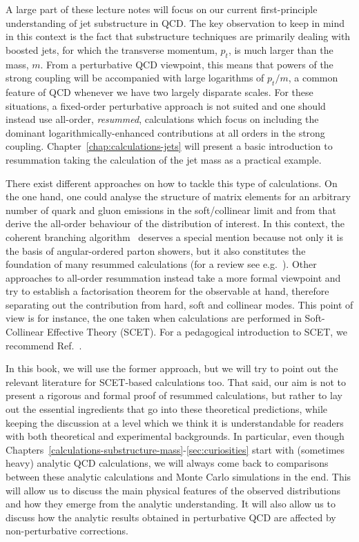 

A large part of these lecture notes will focus on our current
first-principle understanding of jet substructure in QCD.
%
The key observation to keep in mind in this context is the fact that
substructure techniques are primarily dealing with boosted jets, for
which the transverse momentum, $p_t$, is much larger than the mass,
$m$.
%
From a perturbative QCD viewpoint, this means that powers of the
strong coupling will be accompanied with large logarithms of $p_t/m$,
a common feature of QCD whenever we have two largely disparate scales.
%
For these situations, a fixed-order perturbative approach is not
suited and one should instead use all-order, {\em resummed},
calculations which focus on including the dominant
logarithmically-enhanced contributions at all orders in the strong
coupling.
%
Chapter~\ref{chap:calculations-jets} will present a basic
introduction to resummation taking the calculation of the jet mass as
a practical example.


There exist different approaches on how to tackle this type of
calculations. On the one hand, one could analyse the structure of
matrix elements for an arbitrary number of quark and gluon emissions
in the soft/collinear limit and from that derive the all-order
behaviour of the distribution of interest. In this context, the
coherent branching algorithm~\cite{Catani:1990rr,Catani:1992ua}
deserves a special mention because not only it is the basis of
angular-ordered parton showers, but it also constitutes the foundation
of many resummed calculations (for a review see
e.g.~\cite{Luisoni:2015xha}). Other approaches to all-order
resummation instead take a more formal viewpoint and try to establish
a factorisation theorem for the observable at hand, therefore
separating out the contribution from hard, soft and collinear
modes. This point of view is for instance, the one taken when
calculations are performed in Soft-Collinear Effective Theory
(SCET). For a pedagogical introduction to SCET, we recommend
Ref.~\cite{Becher:2014oda}.

In this book, we will use the former approach, but we will try to
point out the relevant literature for SCET-based calculations too.
%
That said, our aim is not to present a rigorous and formal proof of
resummed calculations, but rather to lay out the essential ingredients
that go into these theoretical predictions, while keeping the
discussion at a level which we think it is understandable for readers
with both theoretical and experimental backgrounds.
%
In particular, even though
Chapters~\ref{calculations-substructure-mass}-\ref{sec:curiosities}
start with (sometimes heavy) analytic QCD calculations, we will always
come back to comparisons between these analytic calculations and Monte
Carlo simulations in the end.
%
This will allow us to discuss the main physical features of the
observed distributions and how they emerge from the analytic
understanding. It will also allow us to discuss how the analytic
results obtained in perturbative QCD are affected by non-perturbative
corrections.




